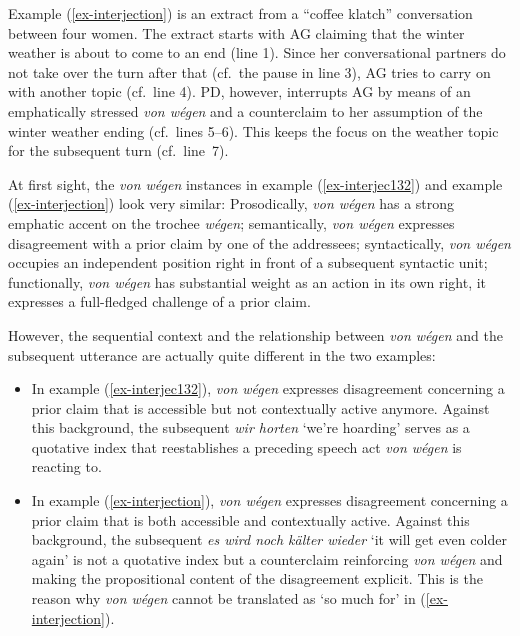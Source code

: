 \documentclass[output=paper
  ,nobabel
  ,draftmode
  ,babelshorthands
  ,colorlinks, citecolor=brown
]{langscibook}
\begin{document}
\noindent
Example (\ref{ex-interjection}) is an extract from a ``coffee klatch'' conversation between four women. The extract starts with AG claiming that the winter weather is about to come to an end (line 1). Since her conversational partners do not take over the turn after that (cf.\ the pause in line 3), AG tries to carry on with another topic (cf.\ line 4). PD, however, interrupts AG by means of an emphatically stressed \emph{von wégen} and a counterclaim to her assumption of the winter weather ending (cf.\ lines 5--6). This keeps the focus on the weather topic for the subsequent turn (cf.\ line~7).

\largerpage
At first sight, the \emph{von wégen} instances in example (\ref{ex-interjec132}) and example (\ref{ex-interjection}) look very similar: Prosodically, \emph{von wégen} has a strong emphatic accent on the trochee \emph{wégen}; semantically, \emph{von wégen} expresses disagreement with a prior claim by one of the addressees; syntactically, \emph{von wégen} occupies an independent position right in front of a subsequent syntactic unit; functionally, \emph{von wégen} has substantial weight as an action in its own right, it expresses a full-fledged challenge of a prior claim.

However, the sequential context and the relationship between \emph{von wégen} and the subsequent utterance are actually quite different in the two examples:

\begin{itemize}
    \item In example (\ref{ex-interjec132}), \emph{von wégen} expresses disagreement concerning a prior claim that is accessible but not contextually active anymore. Against this background, the subsequent \emph{wir horten} `we're hoarding' serves as a quotative index that reestablishes a preceding speech act \emph{von wégen} is reacting to.
    
    \item In example (\ref{ex-interjection}), \emph{von wégen} expresses disagreement concerning a prior claim that is both accessible and contextually active. Against this background, the subsequent \emph{es wird noch kälter wieder} `it will get even colder again' is not a quotative index but a counterclaim reinforcing \emph{von wégen} and making the propositional content of the disagreement explicit. This is the reason why \emph{von wégen} cannot be translated as `so much for' in (\ref{ex-interjection}).
\end{itemize}
\end{document}
